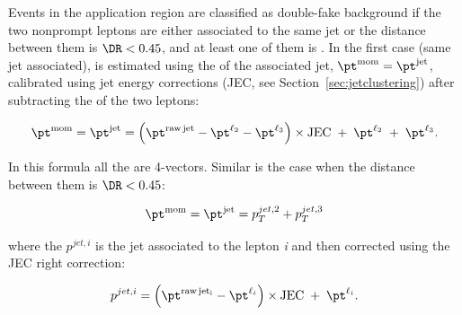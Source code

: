 Events in the application region are classified as double-fake
background if the two nonprompt leptons are either associated to the same
jet or the distance between them is $\DR<0.45$, and at least one of them is \lD.
In the first case (same jet associated), \ptm is estimated using the \pt of the associated
jet, $\ptm=\ptj$, calibrated using jet energy corrections (JEC, see
Section~\ref{sec:jetclustering}) after subtracting the \pt of the two leptons:
\begin{linenomath}
  \begin{equation}
    \label{eq:ptjet}
    \ptm = \ptj =
    \left(\pt^{\mathrm{raw\,jet}}-\pt^{\ltwo}-\pt^{\lthree}\right)\times\mathrm{JEC}
    \;+\; \pt^{\ltwo} \;+\; \pt^{\lthree}.
  \end{equation}
\end{linenomath}
In this formula all the \pt are 4-vectors.
Similar is the case when the distance between them is $\DR<0.45$:
\begin{linenomath}
  \begin{equation}
    \label{eq:ptjet_45}
    \ptm = \ptj = p^{jet,2}_T + p^{jet,3}_T 
  \end{equation}
\end{linenomath}
where the $p^{jet,i}$ is the jet associated to the lepton \emph{i} and then corrected using the JEC right correction:
\begin{linenomath}
  \begin{equation}
    \label{eq:ptjet_45_single}
    p^{jet,i} = \left(\pt^{\mathrm{raw\,jet_i}}-\pt^{\ell_{i}}\right)\times\mathrm{JEC}\;+\; \pt^{\ell_i} .
  \end{equation}
\end{linenomath}

